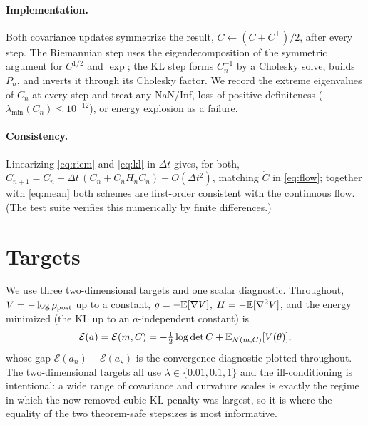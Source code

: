 \documentclass[11pt]{article}
\begin{document}
\paragraph{Implementation.}
Both covariance updates symmetrize the result, $C\leftarrow(C+C^\top)/2$, after
every step. The Riemannian step uses the eigendecomposition of the symmetric
argument for $C^{1/2}$ and $\exp$; the KL step forms $C_n^{-1}$ by a Cholesky
solve, builds $P_n$, and inverts it through its Cholesky factor. We record the
extreme eigenvalues of $C_n$ at every step and treat any NaN/Inf, loss of
positive definiteness ($\lambda_{\min}(C_n)\le10^{-12}$), or energy explosion as
a failure.

\paragraph{Consistency.}
Linearizing \eqref{eq:riem} and \eqref{eq:kl} in $\Delta t$ gives, for both,
$C_{n+1}=C_n+\Delta t\,(C_n+C_nH_nC_n)+O(\Delta t^2)$, matching $\dot C$ in
\eqref{eq:flow}; together with \eqref{eq:mean} both schemes are first-order
consistent with the continuous flow. (The test suite verifies this numerically by
finite differences.)

\section{Targets}\label{sec:targets}

We use three two-dimensional targets and one scalar diagnostic. Throughout,
$V=-\log\rho_{\mathrm{post}}$ up to a constant, $g=-\mathbb{E}[\nabla V]$, $H=-\mathbb{E}[\nabla^2 V]$, and
the energy minimized (the KL up to an $a$-independent constant) is
\begin{equation}\label{eq:F}
\mathcal{E}(a)=\mathcal{E}(m,C)=-\tfrac12\log\det C+\mathbb{E}_{\mathcal{N}(m,C)}[V(\theta)],
\end{equation}
whose gap $\mathcal{E}(a_n)-\mathcal{E}(a_\star)$ is the convergence diagnostic
plotted throughout.
The two-dimensional targets all use $\lambda\in\{0.01,0.1,1\}$ and the
ill-conditioning is intentional: a wide range of covariance and curvature scales
is exactly the regime in which the now-removed cubic KL penalty was largest, so it
is where the equality of the two theorem-safe stepsizes is most informative.
\end{document}
